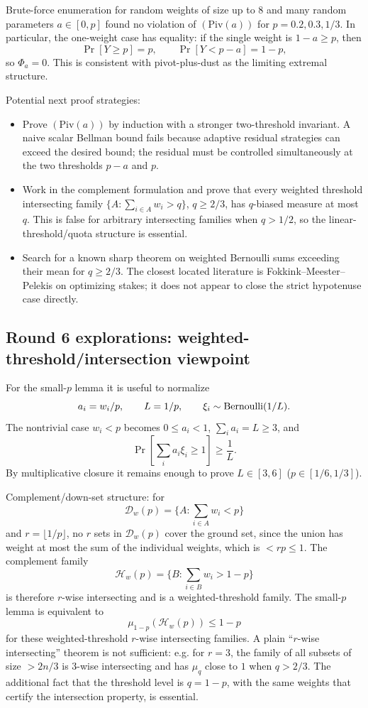 \documentclass[12pt]{article}
\begin{document}
Brute-force enumeration for random weights of size up to \(8\) and many random
parameters \(a\in[0,p]\) found no violation of \((\mathrm{Piv}(a))\) for
\(p=0.2,0.3,1/3\).  In particular, the one-weight case has equality:
if the single weight is \(1-a\ge p\), then
\[
\Pr[Y\ge p]=p,\qquad \Pr[Y<p-a]=1-p,
\]
so \(\Phi_a=0\).  This is consistent with pivot-plus-dust as the limiting
extremal structure.

Potential next proof strategies:
\begin{itemize}
\item Prove \((\mathrm{Piv}(a))\) by induction with a stronger two-threshold
invariant.  A naive scalar Bellman bound fails because adaptive residual
strategies can exceed the desired bound; the residual must be controlled
simultaneously at the two thresholds \(p-a\) and \(p\).
\item Work in the complement formulation and prove that every weighted
threshold intersecting family
\(\{A:\sum_{i\in A}w_i>q\}\), \(q\ge2/3\), has \(q\)-biased measure at most
\(q\).  This is false for arbitrary intersecting families when \(q>1/2\), so
the linear-threshold/quota structure is essential.
\item Search for a known sharp theorem on weighted Bernoulli sums exceeding
their mean for \(q\ge2/3\).  The closest located literature is
Fokkink--Meester--Pelekis on optimizing stakes; it does not appear to close the
strict hypotenuse case directly.
\end{itemize}


\subsection*{Round 6 explorations: weighted-threshold/intersection viewpoint}

For the small-\(p\) lemma it is useful to normalize
\[
  a_i=w_i/p,\qquad L=1/p,\qquad \xi_i\sim{\rm Bernoulli}(1/L).
\]
The nontrivial case \(w_i<p\) becomes \(0\le a_i<1\), \(\sum_i a_i=L\ge3\), and
\[
  \Pr\!\left[\sum_i a_i\xi_i\ge1\right]\ge\frac1L .
\]
By multiplicative closure it remains enough to prove \(L\in[3,6]\)
(\(p\in[1/6,1/3]\)).

Complement/down-set structure: for
\[
  \mathcal D_w(p)=\{A:\sum_{i\in A}w_i<p\}
\]
and \(r=\lfloor1/p\rfloor\), no \(r\) sets in \(\mathcal D_w(p)\) cover the
ground set, since the union has weight at most the sum of the individual
weights, which is \(<rp\le1\).  The complement family
\[
  \mathcal H_w(p)=\{B:\sum_{i\in B}w_i>1-p\}
\]
is therefore \(r\)-wise intersecting and is a weighted-threshold family.  The
small-\(p\) lemma is equivalent to
\[
  \mu_{1-p}(\mathcal H_w(p))\le1-p
\]
for these weighted-threshold \(r\)-wise intersecting families.  A plain
``\(r\)-wise intersecting'' theorem is not sufficient: e.g. for \(r=3\), the
family of all subsets of size \(>2n/3\) is 3-wise intersecting and has
\(\mu_q\) close to \(1\) when \(q>2/3\).  The additional fact that the threshold
level is \(q=1-p\), with the same weights that certify the intersection
property, is essential.
\end{document}

